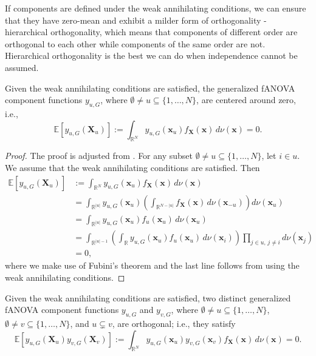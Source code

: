 If components are defined under the weak annihilating conditions, we can ensure that they have zero-mean and exhibit a milder form of orthogonality - hierarchical orthogonality, which means that components of different order are orthogonal to each other while components of the same order are not. Hierarchical orthogonality is the best we can do when independence cannot be assumed.
\begin{proposition}\label{eq:zero_mean_g}
    Given the weak annihilating conditions are satisfied, the generalized fANOVA component functions $y_{u, G}$, where $\emptyset \neq u \subseteq \{1, \ldots, N\}$, are centered around zero, i.e.,
\begin{equation}
    \mathbb{E}[y_{u, G}(\boldsymbol{X}_u)] := \int_{\mathbb{R}^N} y_{u, G}(\boldsymbol{x}_u) f_{\boldsymbol{X}}(\boldsymbol{x}) \, d\nu (\boldsymbol{x}) = 0.
\end{equation}
\end{proposition}

\begin{proof}
The proof is adjusted from \cite{rahman2014}. For any subset $\emptyset \ne u \subseteq \{1, \ldots, N\}$, let $i \in u$. We assume that the weak annihilating conditions are satisfied. Then
\begin{align*}
\mathbb{E}[y_{u,G}(\boldsymbol{X}_u)] 
&:= \int_{\mathbb{R}^N} y_{u,G}(\boldsymbol{x}_u) f_{\boldsymbol{X}}(\boldsymbol{x})\, d \nu (\boldsymbol{x}) \\[0.5em]
&= \int_{\mathbb{R}^{|u|}} y_{u,G}(\boldsymbol{x}_u) \left( \int_{\mathbb{R}^{N - |u|}} f_{\boldsymbol{X}}(\boldsymbol{x}) \, d \nu(\boldsymbol{x}_{-u}) \right) d \nu(\boldsymbol{x}_u) \\[0.5em]
&= \int_{\mathbb{R}^{|u|}} y_{u,G}(\boldsymbol{x}_u) f_u(\boldsymbol{x}_u)\, d \nu(\boldsymbol{x}_u) \\[0.5em]
&= \int_{\mathbb{R}^{|u| - 1}} \left( \int_{\mathbb{R}} y_{u,G}(\boldsymbol{x}_u) f_u(\boldsymbol{x}_u) \, d \nu(\boldsymbol{x}_i) \right) \prod_{j \in u,\, j \ne i} d \nu(\boldsymbol{x}_j) \\[0.5em]
&= 0,
\end{align*}
where we make use of Fubini's theorem and the last line follows from using the weak annihilating conditions.
\end{proof}

\begin{proposition}\label{prop:hierarchical_orthogonality}
    Given the weak annihilating conditions are satisfied, two distinct generalized fANOVA component functions $y_{u,G}$ and $y_{v,G}$, where $\emptyset \neq u \subseteq \{1,\ldots,N\}$, $\emptyset \neq v \subseteq \{1,\ldots,N\}$, and $u \subsetneq v$, are orthogonal; i.e., they satisfy
\begin{equation}
    \mathbb{E}[y_{u, G}(\boldsymbol{X}_u)y_{v, G}(\boldsymbol{X}_v)] := \int_{\mathbb{R}^N} y_{u, G}(\boldsymbol{x}_u) y_{v, G}(\boldsymbol{x}_v) f_{\boldsymbol{X}}(\boldsymbol{x}) \, d\nu (\boldsymbol{x}) = 0.
\end{equation}
\end{proposition}

